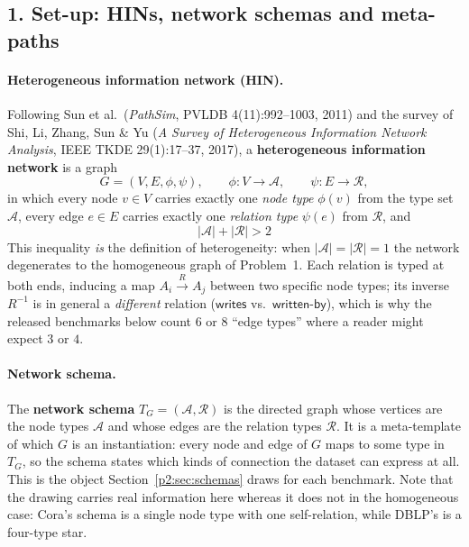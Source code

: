 \newcommand{\pTwoTgt}{orange!22}
\newcommand{\pTwoAgt}{blue!12}
\newcommand{\pTwoAtt}{green!14}
\newcommand{\pTwoVen}{purple!12}

\subsection*{1. Set-up: HINs, network schemas and meta-paths}

\paragraph{Heterogeneous information network (HIN).}
Following Sun et al.\ (\emph{PathSim}, PVLDB 4(11):992--1003, 2011) and the survey of Shi, Li,
Zhang, Sun \& Yu (\emph{A Survey of Heterogeneous Information Network Analysis}, IEEE TKDE
29(1):17--37, 2017), a \textbf{heterogeneous information network} is a graph
\[
  G=(V,E,\phi,\psi),\qquad \phi:V\to\mathcal{A},\qquad \psi:E\to\mathcal{R},
\]
in which every node $v\in V$ carries exactly one \emph{node type} $\phi(v)$ from the type set
$\mathcal{A}$, every edge $e\in E$ carries exactly one \emph{relation type} $\psi(e)$ from
$\mathcal{R}$, and
\[
  \boxed{\;|\mathcal{A}|+|\mathcal{R}|>2\;}
\]
This inequality \emph{is} the definition of heterogeneity: when $|\mathcal{A}|=|\mathcal{R}|=1$
the network degenerates to the homogeneous graph of Problem~1. Each relation is typed at both
ends, inducing a map $A_i\xrightarrow{R}A_j$ between two specific node types; its inverse
$R^{-1}$ is in general a \emph{different} relation ($\mathsf{writes}$ vs.\ $\mathsf{written\text{-}by}$),
which is why the released benchmarks below count $6$ or $8$ ``edge types'' where a reader might
expect $3$ or $4$.

\paragraph{Network schema.}
The \textbf{network schema} $T_G=(\mathcal{A},\mathcal{R})$ is the directed graph whose vertices
are the node types $\mathcal{A}$ and whose edges are the relation types $\mathcal{R}$. It is a
meta-template of which $G$ is an instantiation: every node and edge of $G$ maps to some type in
$T_G$, so the schema states which kinds of connection the dataset can express at all. This is the
object Section~\ref{p2:sec:schemas} draws for each benchmark. Note that the drawing carries real
information here whereas it does not in the homogeneous case: Cora's schema is a single node type
with one self-relation, while DBLP's is a four-type star.

